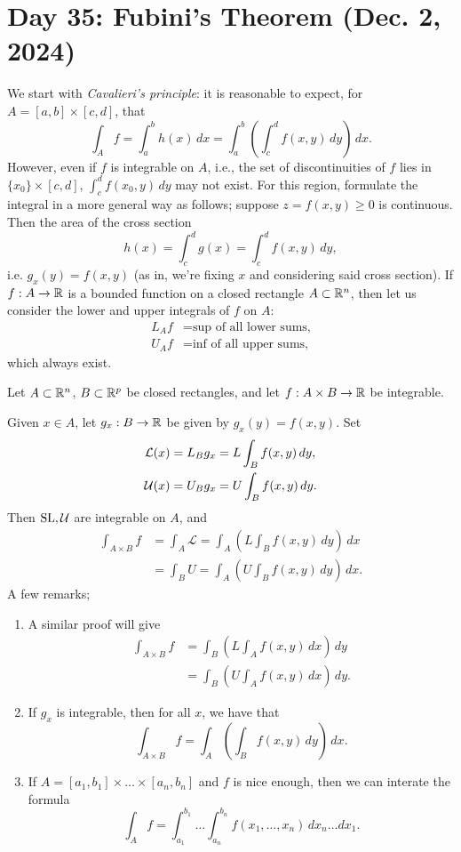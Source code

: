 \section{Day 35: Fubini's Theorem (Dec. 2, 2024)}
We start with \textit{Cavalieri's principle}: it is reasonable to expect, for $A = [a, b] \times [c, d]$, that
\[ \int_A f = \int_a^b h(x) \, dx = \int_a^b \left(\int_c^d f(x, y) \, dy\right) \, dx. \] 
However, even if $f$ is integrable on $A$, i.e., the set of discontinuities of $f$ lies in $\{x_0\} \times [c, d]$, $\int_c^d f(x_0, y) \, dy$ may not exist. For this region, formulate the integral in a more general way as follows; suppose $z = f(x, y) \geq 0$ is continuous. Then the area of the cross section
\[ h(x) = \int_c^d g(x) = \int_c^d f(x, y) \, dy, \]
i.e. $g_x(y) = f(x, y)$ (as in, we're fixing $x$ and considering said cross section). If $f : A \to \mathbb R$ is a bounded function on a closed rectangle $A \subset \mathbb R^n$, then let us consider the lower and upper integrals of $f$ on $A$:
\begin{align*}
    L_A f &= \text{sup of all lower sums,} \\
    U_A f &= \text{inf of all upper sums,}
\end{align*}
which always exist.
\begin{simplethm}
    Let $A \subset \mathbb R^n$, $B \subset \mathbb R^p$ be closed rectangles, and let $f : A \times B \to \mathbb R$ be integrable.
\end{simplethm}
\noindent Given $x \in A$, let $g_x : B \to \mathbb R$ be given by $g_x(y) = f(x, y)$. Set
\begin{align*}
    \mathcal{L}(x) &= L_B g_x = L \int_B f(x, y) \, dy, \\
    \mathcal U(x) &= U_B g_x = U \int_B f(x, y) \, dy.
\end{align*}
Then $\operatorname{SL}, \mathcal U$ are integrable on $A$, and
\begin{align*}
    \int_{A \times B} f &= \int_A \mathcal{L} = \int_A \left( L \int_B f(x, y) \, dy \right) \, dx \\
    &= \int_B U = \int_A \left( U \int_B f(x, y) \, dy \right) \, dx.
\end{align*}
A few remarks;
\begin{enumerate}[label=(\roman*)]
    \item A similar proof will give
    \begin{align*}
        \int_{A \times B} f &= \int_B \left( L \int_A f(x, y) \, dx \right) \, dy \\
        &= \int_B \left( U \int_A f(x, y) \, dx \right) \, dy.
    \end{align*}
    \item If $g_x$ is integrable, then for all $x$, we have that
    \[ \int_{A \times B} f = \int_A \left( \int_B f(x, y) \, dy \right) \, dx. \]
    \item If $A = [a_1, b_1] \times \dots \times [a_n, b_n]$ and $f$ is nice enough, then we can interate the formula
    \[ \int_A f = \int_{a_1}^{b_1} \dots \int_{a_n}^{b_n} f(x_1, \dots, x_n) \, dx_n \dots dx_1. \]
\end{enumerate}
